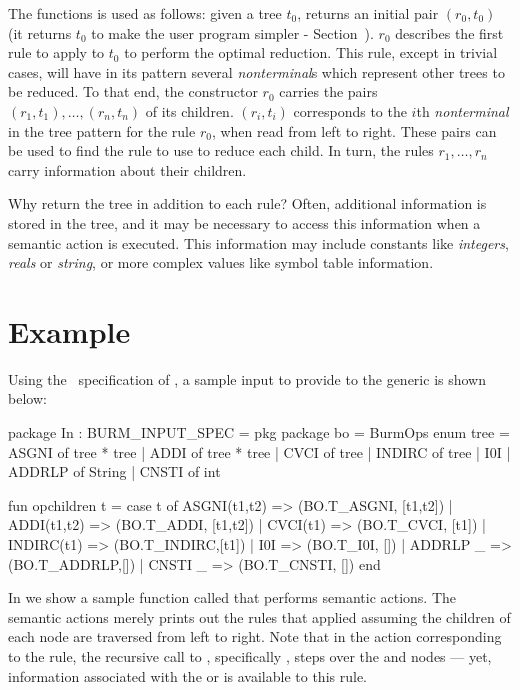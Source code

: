 The functions  is used as follows: given a tree $t_0$,
 returns an initial pair $(r_0, t_0)$ (it returns $t_0$ to
make the user program simpler - Section\ ).
$r_0$
describes the first rule to apply to $t_0$ to perform the optimal
reduction.  This rule, except in trivial cases, will have in its
pattern several {\sl nonterminal}s which represent other trees to be
reduced.  To that end, the constructor $r_0$ carries the pairs 
\mbox{$(r_1,t_1), \ldots, (r_n,t_n)$} of its children.
$(r_i,t_i)$ corresponds to the $i$th {\sl nonterminal} in the tree pattern
for the rule $r_0$, when read from left to right.  These pairs can be used
to find the rule to use to reduce each child. In turn, the rules $r_1,
\ldots, r_n$ carry information about their children.

Why return the tree in addition to each rule?  Often, additional
information is stored in the tree, and it may be necessary to access this
information when a semantic action is executed. This information may
include constants like {\em integers}, {\em reals} or {\em string}, or more
complex values like symbol table information.


		\section{Example}
		\label{s:example}

Using the \mlburg\ specification of , a sample
input to provide to the generic  is shown below:
\begin{code}
      package In : BURM_INPUT_SPEC = pkg
	package bo = BurmOps
	enum tree = 
	      ASGNI  of tree * tree
	    | ADDI   of tree * tree
	    | CVCI   of tree
	    | INDIRC of tree
	    | I0I
	    | ADDRLP of String
	    | CNSTI  of int

	fun opchildren t =
	  case t of
	    ASGNI(t1,t2)  => (BO.T_ASGNI, [t1,t2])
	  | ADDI(t1,t2)   => (BO.T_ADDI,  [t1,t2])
	  | CVCI(t1)      => (BO.T_CVCI,  [t1])
	  | INDIRC(t1)    => (BO.T_INDIRC,[t1])
	  | I0I           => (BO.T_I0I,   [])
	  | ADDRLP _      => (BO.T_ADDRLP,[])
	  | CNSTI _       => (BO.T_CNSTI, [])
      end
\end{code}




In  we show a sample function called  that
performs semantic actions. The semantic actions merely prints out the
rules that applied assuming the children of each node are traversed
from left to right. Note that in the action corresponding to the
 rule, the recursive call to ,
specifically , steps over the  and 
nodes --- yet, information associated with the  or
 is available to this rule.



